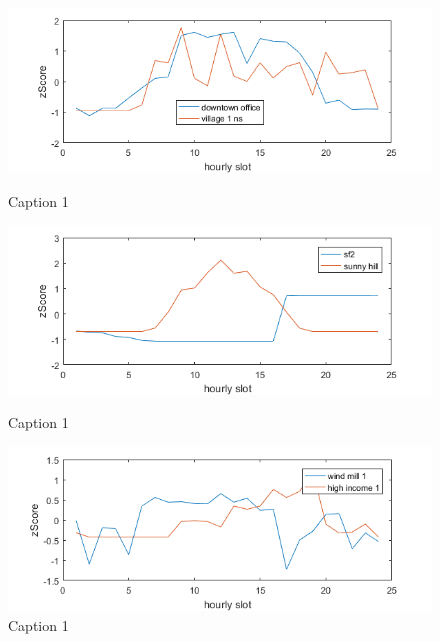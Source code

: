 \begin{figure}[!h]
\centering
\includegraphics{daily1.png}
\caption{Caption 1}
\label{fig:daily1}
\includegraphics{daily2.png}
\caption{Caption 1}
\label{fig:daily2}
\includegraphics{daily3.png}
\caption{Caption 1}
\label{fig:daily3}
\end{figure}

